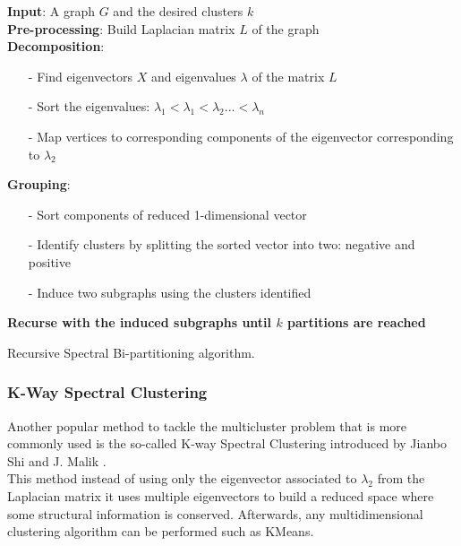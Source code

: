 \documentclass[11pt]{extarticle}
\begin{document}
\begin{algorithm}[h]
\textbf{Input}: A graph $G$ and the desired clusters $k$\\
\textbf{Pre-processing}: Build Laplacian matrix $L$ of the graph\\
\textbf{Decomposition}:
\begin{itemize}
    \item[-] Find eigenvectors $X$ and eigenvalues $\lambda$ of the matrix $L$
    \item[-] Sort the eigenvalues:  $\lambda_1 < \lambda_1 < \lambda_2 ... < \lambda_n$
    \item[-] Map vertices to corresponding components of the eigenvector corresponding to $\lambda_2$
\end{itemize}
\textbf{Grouping}:
\begin{itemize}
    \item[-] Sort components of reduced 1-dimensional vector
    \item[-] Identify clusters by splitting the sorted vector into two: negative and positive 
    \item[-] Induce two subgraphs using the clusters identified
\end{itemize}
\textbf{Recurse with the induced subgraphs until $k$ partitions are reached}
\caption{Recursive Spectral Bi-partitioning algorithm.}
\end{algorithm}

\subsubsection{K-Way Spectral Clustering}

Another popular method to tackle the multicluster problem that is more commonly used is the so-called K-way Spectral Clustering introduced by Jianbo Shi and J. Malik \cite{JianboShi2000}.\\

This method instead of using only the eigenvector associated to $\lambda_2$ from the Laplacian matrix it uses multiple eigenvectors to build a reduced space where some structural information is conserved. Afterwards, any multidimensional clustering algorithm can be performed such as KMeans.\\
\end{document}
